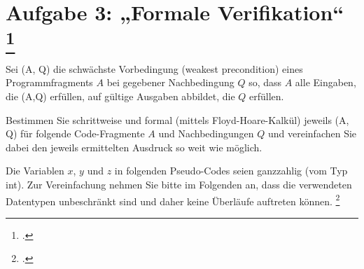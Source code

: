 \documentclass{lehramt-informatik-aufgabe}
\begin{document}
\let\wp=\liWpKalkuel
\let\equivalent=\liWpEquivalent
\let\erklaerung=\liWpErklaerung
\def\m#1{\textcolor{blue}{#1}}
\def\k#1{\hfill{\scriptsize(#1)}}


\section{Aufgabe 3: „Formale Verifikation“
\footcite{examen:46116:2015:09}}

Sei (A, Q) die schwächste Vorbedingung (weakest precondition)
eines Programmfragments $A$ bei gegebener Nachbedingung $Q$ so, dass $A$
alle Eingaben, die (A,Q) erfüllen, auf gültige Ausgaben
abbildet, die $Q$ erfüllen.

Bestimmen Sie schrittweise und formal (mittels Floyd-Hoare-Kalkül)
jeweils (A, Q) für folgende Code-Fragmente $A$ und
Nachbedingungen $Q$ und vereinfachen Sie dabei den jeweils ermittelten
Ausdruck so weit wie möglich.

Die Variablen $x$, $y$ und $z$ in folgenden Pseudo-Codes seien
ganzzahlig (vom Typ int). Zur Vereinfachung nehmen Sie bitte im
Folgenden an, dass die verwendeten Datentypen unbeschränkt sind und
daher keine Überläufe auftreten können.
\footcite{sosy:pu:5:4}
\end{document}
